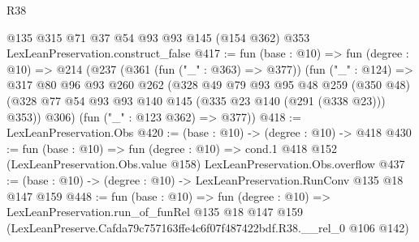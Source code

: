 \begin{lexlean}{R38}
\begin{coremodule}
    @135
    @315
    @71
    @37
    @54
    @93
    @93
    @145
    (@154 @362)
    @353
    LexLeanPreservation.construct_false
@417 := fun (base : @10) =>
  fun (degree : @10) =>
  @214
    (@237
      (@361 (fun ("_" : @363) => @377))
      (fun ("_" : @124) =>
      @317
        @80
        @96
        @93
        @260
        @262
        (@328
          @49
          @79
          @93
          @95
          @48
          @259
          (@350 @48)
          (@328 @77 @54 @93 @93 @140 @145 (@335 @23 @140 (@291 (@338 @23))) @353))
        @306)
      (fun ("_" : @123 @362) => @377))
@418 := LexLeanPreservation.Obs
@420 := (base : @10) -> (degree : @10) -> @418
@430 := fun (base : @10) =>
  fun (degree : @10) =>
  cond.{1} @418 @152 (LexLeanPreservation.Obs.value @158) LexLeanPreservation.Obs.overflow
@437 := (base : @10) -> (degree : @10) -> LexLeanPreservation.RunConv @135 @18 @147 @159
@448 := fun (base : @10) =>
  fun (degree : @10) =>
  LexLeanPreservation.run_of_funRel
    @135
    @18
    @147
    @159
    (LexLeanPreserve.Cafda79c757163ffe4c6f07f487422bdf.R38.__rel_0 @106 @142)
\end{coremodule}
\end{lexlean}
